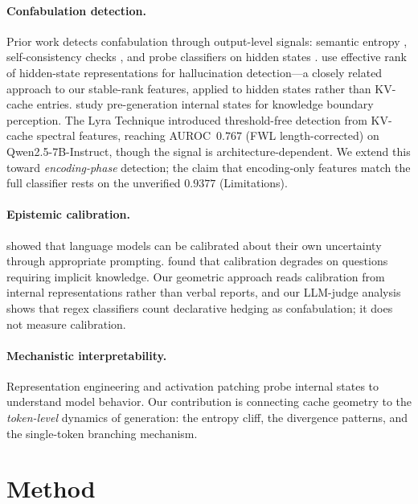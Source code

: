 \documentclass[11pt,a4paper]{article}
\begin{document}
\paragraph{Confabulation detection.}
Prior work detects confabulation through output-level signals: semantic
entropy \citep{kuhn2023semantic, farquhar2024semantic}, self-consistency
checks \citep{manakul2023selfcheckgpt}, and probe classifiers on hidden
states \citep{burns2022discovering, li2024inference}.
\citet{wang2025effective} use effective rank of hidden-state
representations for hallucination detection---a closely related approach
to our stable-rank features, applied to hidden states rather than
KV-cache entries. \citet{ni2025internal} study pre-generation internal
states for knowledge boundary perception. The Lyra Technique
\citep{lyra2026spectral} introduced threshold-free detection from
KV-cache spectral features, reaching AUROC~$0.767$ (FWL length-corrected) on
Qwen2.5-7B-Instruct, though the signal is architecture-dependent. We extend this toward \emph{encoding-phase} detection;
the claim that encoding-only features match the full classifier rests on
the unverified $0.9377$ (Limitations).

\paragraph{Epistemic calibration.}
\citet{kadavath2022language} showed that language models can be
calibrated about their own uncertainty through appropriate prompting.
\citet{xiong2024llms} found that calibration degrades on questions
requiring implicit knowledge. Our geometric approach reads calibration
from internal representations rather than verbal reports, and our
LLM-judge analysis shows that regex classifiers count declarative hedging as confabulation; it does not measure calibration.

\paragraph{Mechanistic interpretability.}
Representation engineering \citep{zou2023representation} and activation
patching \citep{meng2023locating} probe internal states to understand
model behavior. Our contribution is connecting cache geometry to the
\emph{token-level} dynamics of generation: the entropy cliff, the
divergence patterns, and the single-token branching mechanism.

\section{Method}
\end{document}

